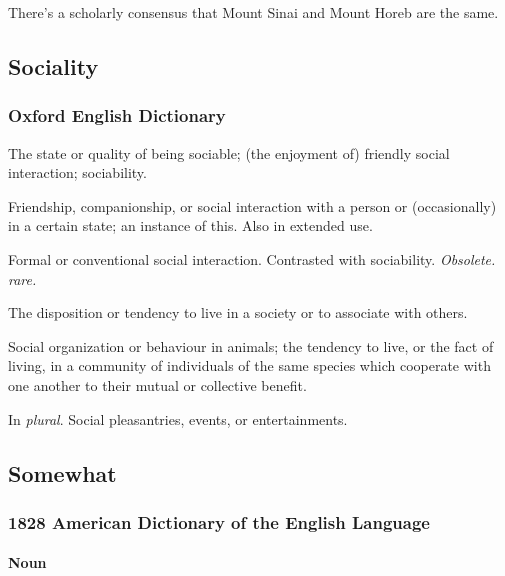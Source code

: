 		There's a scholarly consensus that Mount Sinai and Mount Horeb are the same.
		
	\subsection{Sociality} %
		\label{SOCIALITY}
	
		\subsubsection{Oxford English Dictionary}
		
			\begin{compactitem}
				\item[1.a] The state or quality of being sociable; (the enjoyment of) friendly social interaction; sociability.
				\item[1.b] Friendship, companionship, or social interaction with a person or (occasionally) in a certain state; an instance of this. Also in extended use.
				\item[1.c] Formal or conventional social interaction. Contrasted with sociability. \textit{Obsolete. rare.}
				\item[2.a] The disposition or tendency to live in a society or to associate with others.
				\item[2.b] Social organization or behaviour in animals; the tendency to live, or the fact of living, in a community of individuals of the same species which cooperate with one another to their mutual or collective benefit.
				\item[3] In \textit{plural}. Social pleasantries, events, or entertainments.
			\end{compactitem}
			
	\subsection{Somewhat} %
		\label{SOMEWHAT}
	
		\subsubsection{1828 American Dictionary of the English Language}
		
			\paragraph{Noun}
			
